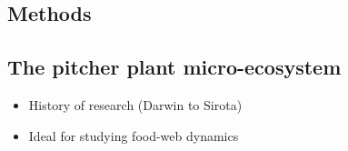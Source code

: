 \documentclass[a0,landscape]{a0poster}
\begin{document}
\begin{multicols}{4}


\color{DarkSlateGray} %




\section*{Methods}


\subsection*{The pitcher plant micro-ecosystem}

\begin{itemize}
\item History of research (Darwin to Sirota)
\item Ideal for studying food-web dynamics
\end{itemize}


\end{multicols}
\end{document}
